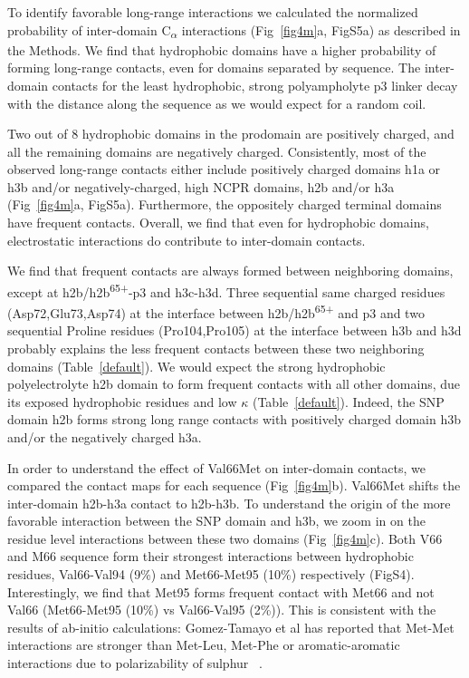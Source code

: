 \documentclass[journal=jacsat,manuscript=article]{achemso}
\begin{document}
To identify favorable long-range interactions we calculated the normalized probability of inter-domain C\textsubscript{$\alpha$} interactions (Fig~\ref{fig4m}a, FigS5a) as described in the Methods. We find that hydrophobic domains have a higher probability of forming long-range contacts, even for domains separated by sequence. The inter-domain contacts for the least hydrophobic, strong polyampholyte p3 linker decay with the distance along the sequence as we would expect for a random coil. 

Two out of 8 hydrophobic domains in the prodomain are positively charged, and all the remaining domains are negatively charged. Consistently, most of the observed long-range contacts either include positively charged domains h1a or h3b  and/or negatively-charged, high NCPR domains, h2b and/or h3a (Fig~\ref{fig4m}a, FigS5a). Furthermore, the oppositely charged terminal domains have frequent contacts. Overall, we find that even for hydrophobic domains, electrostatic interactions do contribute to inter-domain contacts.


We find that frequent contacts are always formed between neighboring domains, except at h2b/h2b\textsuperscript{65+}-p3 and h3c-h3d. Three sequential same charged residues (Asp72,Glu73,Asp74) at the interface between h2b/h2b\textsuperscript{65+} and p3 and two sequential Proline residues (Pro104,Pro105) at the interface between h3b and h3d probably explains the less frequent contacts between these two neighboring domains (Table~\ref{default}). We would expect the strong hydrophobic polyelectrolyte h2b domain to form frequent contacts with all other domains, due its exposed hydrophobic residues and low $\kappa$ (Table~\ref{default}). Indeed, the SNP domain h2b forms strong long range contacts with positively charged domain h3b and/or the negatively charged h3a.

In order to understand the effect of Val66Met on inter-domain contacts, we compared the contact maps for each sequence (Fig~\ref{fig4m}b). Val66Met shifts the inter-domain h2b-h3a contact to h2b-h3b. 
To understand the origin of the more favorable interaction between the SNP domain and h3b, we zoom in on the residue level interactions between these two domains (Fig~\ref{fig4m}c). Both V66 and M66 sequence form their strongest interactions between hydrophobic residues, Val66-Val94 (9\%) and Met66-Met95 (10\%) respectively (FigS4). Interestingly, we find that Met95 forms frequent contact with Met66 and not Val66 (Met66-Met95 (10\%) vs Val66-Val95 (2\%)). This is consistent with the results of ab-initio calculations: Gomez-Tamayo et al has reported that Met-Met interactions are stronger than Met-Leu, Met-Phe or aromatic-aromatic interactions due to polarizability of sulphur ~\cite{Gomez-Tamayo2016}.
\end{document}
